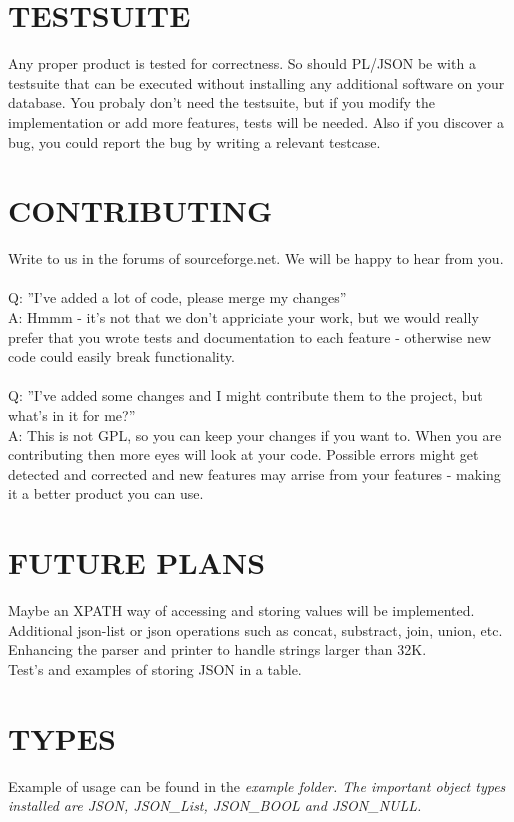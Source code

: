 \documentclass[11pt,twocolumn, a4paper]{article}
\begin{document}
\section*{TESTSUITE}
Any proper product is tested for correctness. So should PL/JSON be with a testsuite that can be executed without installing any additional software on your database. You probaly don't need the testsuite, but if you modify the implementation or add more features, tests will be needed. Also if you discover a bug, you could report the bug by writing a relevant testcase.

\section*{CONTRIBUTING}
Write to us in the forums of sourceforge.net. We will be happy to hear from you. \\\\
Q: ''I've added a lot of code, please merge my changes''\\
A: Hmmm - it's not that we don't appriciate your work, but we would really prefer that you wrote tests and documentation to each feature - otherwise new code could easily break functionality. \\\\
Q: ''I've added some changes and I might contribute them to the project, but what's in it for me?''\\
A: This is not GPL, so you can keep your changes if you want to. 
When you are contributing then more eyes will look at your code. 
Possible errors might get detected and corrected and new features may arrise from your features - making it a better product you can use.

\section*{FUTURE PLANS}
Maybe an XPATH way of accessing and storing values will be implemented.\\
Additional json-list or json operations such as concat, substract, join, union, etc.\\
Enhancing the parser and printer to handle strings larger than 32K.\\
Test's and examples of storing JSON in a table.\\


\onecolumn
\section*{TYPES}
Example of usage can be found in the \em example \em folder. The important object types installed are JSON, JSON\_List, JSON\_BOOL and JSON\_NULL.
\end{document}
